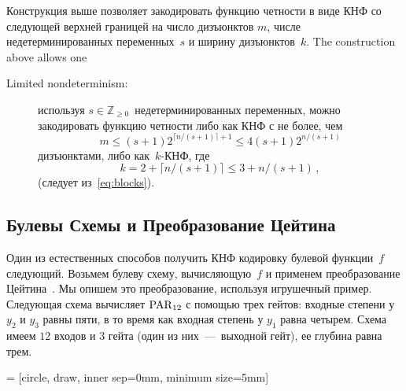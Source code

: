 Конструкция выше позволяет закодировать функцию четности в виде КНФ со следующей верхней границей на число дизъюнктов $m$, числе недетерминированных переменных~$s$ и ширину дизъюнктов~$k$.
The construction above 
allows one 
\begin{description}
	\item[Limited nondeterminism:] используя $s \in \mathbb{Z}_{\ge 0}$~недетерминированных переменных, можно закодировать функцию четности либо
	как КНФ с не более, чем 
	\begin{equation}\label{eq:upperm}
		m \le (s+1)2^{\lceil n/(s+1) \rceil+1} \le 4(s+1)2^{n/(s+1)}
	\end{equation}
	дизъюнктами, либо как~$k$-КНФ, где
	\begin{equation}\label{eq:upperk}
		k=2+{\lceil n/(s+1) \rceil} \le 3+n/(s+1) \, ,
	\end{equation}
	(следует из~\eqref{eq:blocks}).
\end{description}
	

\subsection{Булевы Схемы и Преобразование Цейтина}\label{sec:tseitin}
Один из естественных способов получить КНФ кодировку булевой функции~$f$ следующий.
Возьмем булеву схему, вычисляющую~$f$ и применем преобразование Цейтина~\cite{zbMATH03325539}.
Мы опишем это преобразование, используя игрушечный пример.
Следующая схема вычисляет  $\operatorname{PAR}_{12}$ с помощью трех гейтов:
входные степени у $y_2$ и $y_3$ равны пяти, в то время как входная степень у $y_1$ равна четырем.
Схема имеем $12$ входов и $3$ гейта (один из них~---~выходной гейт), ее глубина равна трем.

 = [circle, draw, inner sep=0mm, minimum size=5mm]


